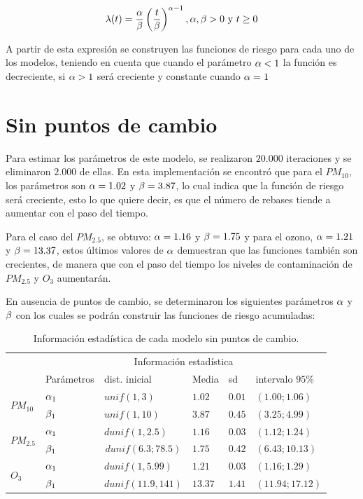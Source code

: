 $$\lambda(t)=\frac{\alpha}{\beta}\left(\frac{t}{\beta}   \right)^{\alpha -1}, \alpha, \beta >0 \text{ y } t \geq 0 $$ 

A partir de esta expresión se construyen las funciones de riesgo para cada uno de los modelos, teniendo en cuenta que cuando el parámetro $\alpha<1$ la función es decreciente, si $\alpha>1$  será creciente y constante cuando $\alpha=1$

\section{Sin puntos de cambio}

Para estimar los parámetros de este modelo, se realizaron $20.000$ iteraciones y se eliminaron $2.000$ de ellas. En esta implementación se encontró que para el $PM_{10}$, los parámetros son $\alpha=1.02$ y $\beta=3.87$, lo cual indica que la función de riesgo será creciente, esto lo que quiere decir, es que el número de rebases tiende a aumentar con el paso del tiempo. 

Para el caso del $PM_{2.5}$, se obtuvo: $\alpha=1.16$ y $\beta=1.75$ y para el ozono, $\alpha=1.21$ y $\beta=13.37$, estos últimos valores de $\alpha$ demuestran que las funciones también son crecientes, de manera que con el paso del tiempo los niveles de contaminación de $PM_{2.5}$ y $O_3$ aumentarán.  

En ausencia de puntos de cambio, se determinaron los siguientes parámetros $\alpha$  y  $\beta$ con los cuales se podrán construir las funciones de riesgo acumuladas: 

\begin{table}[!h]
\centering
\begin{tabular}{|l|l|l|l|l|l|}
\hline
& \multicolumn{5}{c|}{Información estadística} \\
\cline{2-6}
& Parámetros & dist. inicial  & Media & sd  &   intervalo $95 \%$\\
\hline \hline
\multirow{2}{1.5cm}{$PM_{10}$} & $\alpha_1$ & $unif(1,3)$ & $1.02$ & $0.01$ & $(1.00;1.06)$ \\ \cline{2-6}
& $\beta_1$& $unif(1,10)$ & $3.87$ & $0.45$ & $(3.25;4.99)$\\  \cline{1-6}
\multirow{2}{1.5cm}{$PM_{2.5}$} & $\alpha_1$ & $dunif(1,2.5)$& $1.16$ & $0.03$ & $(1.12;1.24)$\\ \cline{2-6}
& $\beta_1$ & \multicolumn{1}{c|}{$dunif(6.3;78.5)$} & $1.75$ & $0.42$ & $(6.43;10.13)$\\ \cline{1-6}
\multirow{2}{1.5cm}{$O_3$} & $\alpha_1$ & $dunif(1,5.99)$ & $1.21$& $0.03$ & $(1.16;1.29)$\\ \cline{2-6}
&$\beta_1$ & \multicolumn{1}{c|}{$dunif(11.9,141)$} & $13.37$ & $1.41$ & $(11.94;17.12)$\\ \cline{1-6}
\end{tabular}
\caption{Información estadística de cada modelo sin puntos de cambio.}
\label{infoestad}
\end{table}



